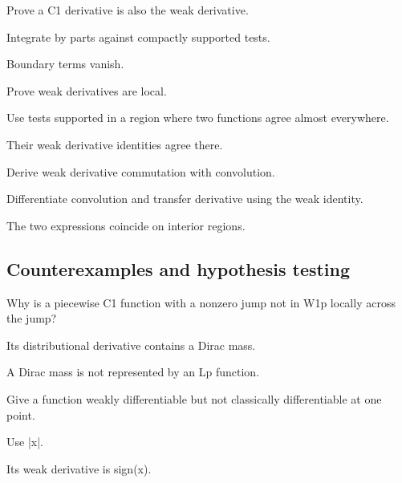 \begin{exercise}\label{exr:iii20-expand-07}
Prove a C1 derivative is also the weak derivative.
\end{exercise}
\begin{hint}
Integrate by parts against compactly supported tests.
\end{hint}
\begin{solution}
Boundary terms vanish.
\end{solution}

\begin{exercise}[Locality]\label{exr:iii20-expand-08}
Prove weak derivatives are local.
\end{exercise}
\begin{hint}
Use tests supported in a region where two functions agree almost everywhere.
\end{hint}
\begin{solution}
Their weak derivative identities agree there.
\end{solution}

\begin{exercise}\label{exr:iii20-expand-09}
Derive weak derivative commutation with convolution.
\end{exercise}
\begin{hint}
Differentiate convolution and transfer derivative using the weak identity.
\end{hint}
\begin{solution}
The two expressions coincide on interior regions.
\end{solution}

\subsection*{Counterexamples and hypothesis testing}

\begin{exercise}\label{exr:iii20-expand-10}
Why is a piecewise C1 function with a nonzero jump not in W1p locally across the jump?
\end{exercise}
\begin{hint}
Its distributional derivative contains a Dirac mass.
\end{hint}
\begin{solution}
A Dirac mass is not represented by an Lp function.
\end{solution}

\begin{exercise}\label{exr:iii20-expand-11}
Give a function weakly differentiable but not classically differentiable at one point.
\end{exercise}
\begin{hint}
Use |x|.
\end{hint}
\begin{solution}
Its weak derivative is sign(x).
\end{solution}

